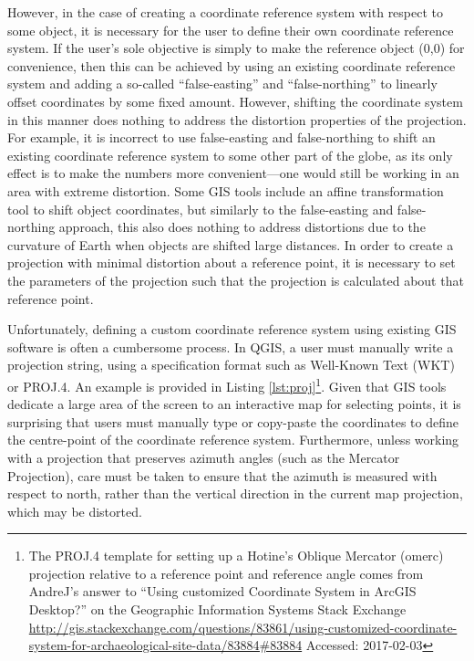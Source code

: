However, in the case of creating a coordinate reference system with respect to
some object, it is necessary for the user to define their own coordinate
reference system. If the user's sole objective is simply to make the
reference object (0,0) for convenience, then this can be achieved by
using an existing coordinate reference system and adding a so-called
``false-easting'' and ``false-northing'' to linearly offset coordinates
by some fixed amount. However, shifting the coordinate system in this
manner does nothing to address the distortion properties of the
projection. For example, it is incorrect to use false-easting and
false-northing to shift an existing coordinate reference system to some
other part of the globe, as its only effect is to make the numbers more
convenient---one would still be working in an area with extreme
distortion. Some GIS tools include an affine transformation tool to
shift object coordinates, but similarly to the false-easting and
false-northing approach, this also does nothing to address distortions
due to the curvature of Earth when objects are shifted large distances.
In order to create a projection with minimal distortion about a
reference point, it is necessary to set the parameters of the projection such
that the projection is calculated about that reference point.

Unfortunately, defining a custom coordinate reference system using existing GIS
software is often a cumbersome process. In QGIS, a user must manually
write a projection string, using a specification format such as
Well-Known Text (WKT) or PROJ.4. An example is provided in Listing
\ref{lst:proj}\footnote{The PROJ.4 template for setting up a Hotine's
  Oblique Mercator (omerc) projection relative to a reference point and
  reference angle comes from AndreJ's answer to ``Using customized
  Coordinate System in ArcGIS Desktop?'' on the Geographic Information
  Systems Stack Exchange
  \url{http://gis.stackexchange.com/questions/83861/using-customized-coordinate-system-for-archaeological-site-data/83884\#83884}
  Accessed: 2017-02-03}. Given that GIS tools dedicate a large area of
the screen to an interactive map for selecting points, it is surprising
that users must manually type or copy-paste the coordinates to define
the centre-point of the coordinate reference system. Furthermore, unless working with
a projection that preserves azimuth angles (such as the Mercator
Projection), care must be taken to ensure that the azimuth is measured
with respect to north, rather than the vertical direction in the current
map projection, which may be distorted.

